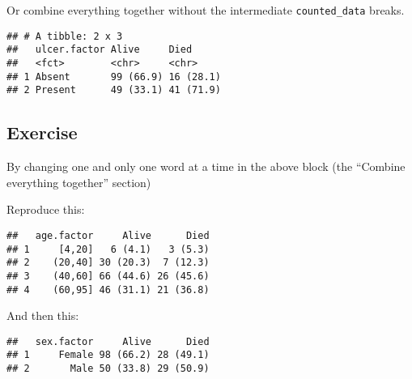 \documentclass[]{book}
\makeatletter
\newenvironment{Shaded}{\begin{snugshade}}{\end{snugshade}}
\newcommand{\KeywordTok}[1]{\textcolor[rgb]{0.13,0.29,0.53}{\textbf{#1}}}
\newcommand{\DataTypeTok}[1]{\textcolor[rgb]{0.13,0.29,0.53}{#1}}
\newcommand{\DecValTok}[1]{\textcolor[rgb]{0.00,0.00,0.81}{#1}}
\newcommand{\StringTok}[1]{\textcolor[rgb]{0.31,0.60,0.02}{#1}}
\newcommand{\OperatorTok}[1]{\textcolor[rgb]{0.81,0.36,0.00}{\textbf{#1}}}
\newcommand{\NormalTok}[1]{#1}
\newenvironment{kframe}{%
\medskip{}
\setlength{\fboxsep}{.8em}
 \def\at@end@of@kframe{}%
 \ifinner\ifhmode%
  \def\at@end@of@kframe{\end{minipage}}%
  \begin{minipage}{\columnwidth}%
 \fi\fi%
 \def\FrameCommand##1{\hskip\@totalleftmargin \hskip-\fboxsep
 \colorbox{shadecolor}{##1}\hskip-\fboxsep
     \hskip-\linewidth \hskip-\@totalleftmargin \hskip\columnwidth}%
 \MakeFramed {\advance\hsize-\width
   \@totalleftmargin\z@ \linewidth\hsize
   \@setminipage}}%
 {\par\unskip\endMakeFramed%
 \at@end@of@kframe}
\renewenvironment{Shaded}{\begin{kframe}}{\end{kframe}}
\theoremstyle{definition}
\theoremstyle{definition}
\theoremstyle{definition}
\theoremstyle{remark}
\makeatother
\begin{document}
Or combine everything together without the intermediate
\texttt{counted\_data} breaks.

\begin{Shaded}
\end{Shaded}

\begin{verbatim}
## # A tibble: 2 x 3
##   ulcer.factor Alive     Died     
##   <fct>        <chr>     <chr>    
## 1 Absent       99 (66.9) 16 (28.1)
## 2 Present      49 (33.1) 41 (71.9)
\end{verbatim}

\subsection{Exercise}\label{exercise-42}

By changing one and only one word at a time in the above block (the
``Combine everything together'' section)

Reproduce this:

\begin{verbatim}
##   age.factor     Alive      Died
## 1     [4,20]   6 (4.1)   3 (5.3)
## 2    (20,40] 30 (20.3)  7 (12.3)
## 3    (40,60] 66 (44.6) 26 (45.6)
## 4    (60,95] 46 (31.1) 21 (36.8)
\end{verbatim}

And then this:

\begin{verbatim}
##   sex.factor     Alive      Died
## 1     Female 98 (66.2) 28 (49.1)
## 2       Male 50 (33.8) 29 (50.9)
\end{verbatim}
\end{document}
